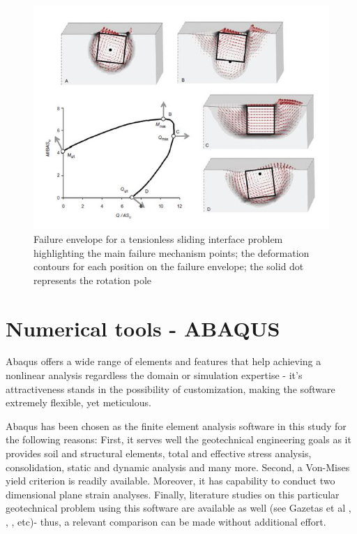 \documentclass[12pt,a4paper]{report}
\begin{document}
\begin{figure}[h!]
	\centering
	\includegraphics[width=0.9\linewidth]{"MQN"}
	\caption{Failure envelope for a tensionless sliding interface problem highlighting the main failure mechanism points; the deformation contours for each position on the failure envelope; the solid dot represents the rotation pole}
	\label{MQN}
\end{figure}

\newpage
\section{Numerical tools - ABAQUS}
Abaqus \cite{hibbett1998abaqus} offers a wide range of elements and features that help achieving a nonlinear analysis regardless the domain or simulation expertise - it's attractiveness stands in the possibility of customization, making the software extremely flexible, yet meticulous. 

Abaqus has been chosen as the finite element analysis software in this study for the following
reasons: First, it serves well the geotechnical engineering goals as it provides soil and structural elements, total and effective stress analysis, consolidation, static and dynamic analysis and many more. Second, a Von-Mises yield criterion is readily available. Moreover, it has capability to conduct two dimensional plane strain analyses. Finally, literature studies on this particular geotechnical problem using this software are available as well (see Gazetas et al \cite{gazetas2013can}, \cite{anastasopoulos2010soil}, \cite{anastasopoulos2014simplified}, etc)- thus, a relevant comparison can be made without additional effort. 
\end{document}

